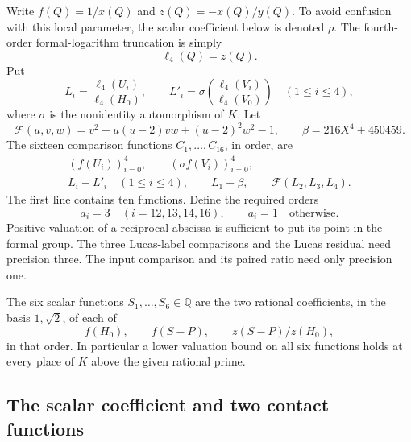 \documentclass[11pt,a4paper]{article}
\newcommand{\Q}{\mathbb Q}\newcommand{\Z}{\mathbb Z}
\begin{document}
Write $f(Q)=1/x(Q)$ and $z(Q)=-x(Q)/y(Q)$. To avoid confusion
with this local parameter, the scalar coefficient below is denoted
$\rho$. The fourth-order formal-logarithm truncation is simply
\[
                           \ell_4(Q)=z(Q).
\]
Put
\[
 L_i=\frac{\ell_4(U_i)}{\ell_4(H_0)},\qquad
 L'_i=\sigma\left(\frac{\ell_4(V_i)}{\ell_4(V_0)}\right)
 \quad(1\le i\le4),
\]
where $\sigma$ is the nonidentity automorphism of $K$. Let
\[
 \mathcal F(u,v,w)=v^2-u(u-2)vw+(u-2)^2w^2-1,
 \qquad \beta=216X^4+450459.
\]
The sixteen comparison functions $C_1,\ldots,C_{16}$, in order,
are
\begin{equation}\label{eq:comparison-list}
 \begin{gathered}
 (f(U_i))_{i=0}^4,\qquad
 (\sigma f(V_i))_{i=0}^4,\\
 L_i-L'_i\quad(1\le i\le4),\qquad
 L_1-\beta,\qquad \mathcal F(L_2,L_3,L_4).
 \end{gathered}
\end{equation}
The first line contains ten functions. Define the required orders
\begin{equation}\label{eq:comparison-orders}
 a_i=3\quad(i=12,13,14,16),\qquad a_i=1\quad\text{otherwise}.
\end{equation}
Positive valuation of a reciprocal abscissa is sufficient to put its
point in the formal group. The three Lucas-label comparisons and the Lucas residual need
precision three. The input comparison and its paired ratio need
only precision one.

The six scalar functions $S_1,\ldots,S_6\in\Q$ are the two
rational coefficients, in the basis $1,\sqrt2$, of each of
\begin{equation}\label{eq:scalar-list}
 f(H_0),\qquad f(S-P),\qquad z(S-P)/z(H_0),
\end{equation}
in that order. In particular a lower valuation bound on all six
functions holds at every place of $K$ above the given rational prime.

\subsection{The scalar coefficient and two contact functions}
\end{document}

